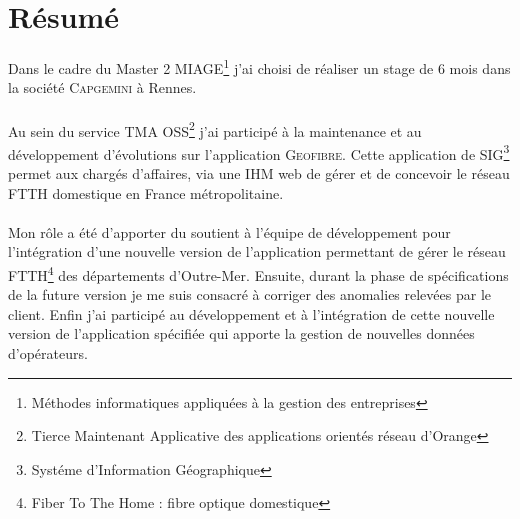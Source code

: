 \chapter*{Résumé}
Dans le cadre du Master 2 MIAGE\footnote{Méthodes informatiques appliquées à la gestion des entreprises}
 j'ai choisi de réaliser un stage de 6 mois dans la société \textsc{Capgemini} à Rennes.
\\\\
Au sein du service TMA OSS\footnote{Tierce Maintenant Applicative des applications orientés réseau d'Orange} j'ai participé à la maintenance et au développement d'évolutions sur l'application \textsc{Geofibre}.
Cette application de SIG\footnote{Systéme d'Information Géographique} permet aux chargés d'affaires, via une IHM web de gérer et de concevoir le réseau FTTH domestique en France métropolitaine.
\\\\
Mon rôle a été d'apporter du soutient à l'équipe de développement pour l'intégration d'une nouvelle version de l'application
permettant de gérer le réseau FTTH\footnote{Fiber To The Home : fibre optique domestique} des départements d'Outre-Mer.
Ensuite, durant la phase de spécifications de la future version je me suis consacré à corriger des anomalies relevées par le client.
Enfin j'ai participé au développement et à l'intégration de cette nouvelle version de l'application spécifiée qui apporte la gestion de nouvelles données d'opérateurs.
